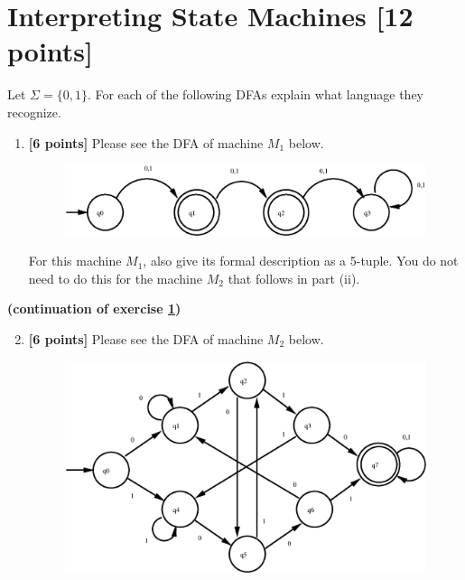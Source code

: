 \newpage
\section{Interpreting State Machines [12 points]}\label{sec:interpreting}
Let $\Sigma = \{0, 1\}$.
For each of the following DFAs explain what language they recognize.%


\begin{enumerate}[label=(\roman*)]
\item \textbf{[6 points]}
Please see the DFA of machine $M_1$ below.
\begin{figure}[h]
\begin{center}
{
\includegraphics[width=0.5\columnwidth]{figs/dfa2}
}
\end{center}
\end{figure}
For this machine $M_1$, also give its formal description as a 5-tuple. 
You do not need to do this for the machine $M_2$ that follows in part (ii).
\end{enumerate}


\newpage
{\begin{center}\textbf{(continuation of exercise \ref{sec:interpreting})}\end{center}}
\begin{enumerate}[label=(\roman*)]\setcounter{enumi}{1}
\item \textbf{[6 points]}
Please see the DFA of machine $M_2$ below.
\begin{figure}[h]
\begin{center}
{
\includegraphics[width=0.5\columnwidth]{figs/dfa3}
}
\end{center}
\end{figure}

\end{enumerate}